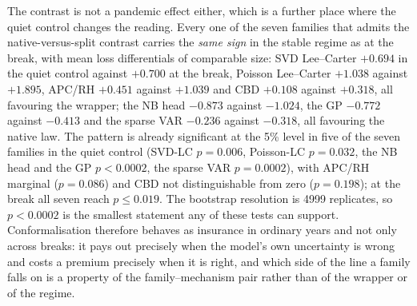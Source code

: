 The contrast is not a pandemic effect either, which is a further place
where the quiet control changes the reading. Every one of
the seven families that admits the native-versus-split contrast carries
the \emph{same sign} in the stable regime as at the break, with mean loss
differentials of comparable size: SVD Lee--Carter $+0.694$ in the quiet
control against $+0.700$ at the break, Poisson Lee--Carter $+1.038$
against $+1.895$, APC/RH $+0.451$ against $+1.039$ and CBD $+0.108$
against $+0.318$, all favouring the wrapper; the NB head $-0.873$ against
$-1.024$, the GP $-0.772$ against $-0.413$ and the sparse VAR $-0.236$
against $-0.318$, all favouring the native law. The pattern is already
significant at the 5\% level in five of the seven families in the quiet
control (SVD-LC $p=0.006$, Poisson-LC $p=0.032$, the NB head and the GP
$p<0.0002$, the sparse VAR $p=0.0002$), with APC/RH marginal ($p=0.086$)
and CBD not distinguishable from zero ($p=0.198$); at the break all seven
reach $p\le0.019$. The bootstrap resolution is 4999 replicates, so
$p<0.0002$ is the smallest statement any of these tests can support.
Conformalisation therefore behaves as insurance in ordinary
years and not only across breaks: it pays out precisely when the model's
own uncertainty is wrong and costs a premium precisely when it is right,
and which side of the line a family falls on is a property of the
family--mechanism pair rather than of the wrapper or of the regime.

